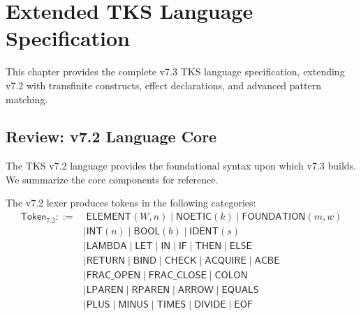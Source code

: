 
\chapter{Extended TKS Language Specification}
\label{ch:extended-language}

\begin{tcolorbox}[colback=blue!5!white,colframe=blue!75!black,title=\vnewthree]
This chapter provides the complete v7.3 TKS language specification, extending v7.2 with transfinite constructs, effect declarations, and advanced pattern matching.
\end{tcolorbox}

\section{Review: v7.2 Language Core}
\label{sec:review-v72-language}

The TKS v7.2 language provides the foundational syntax upon which v7.3 builds. We summarize the core components for reference.

\begin{definition}
\label{def:v72-token-summary}
The v7.2 lexer produces tokens in the following categories:
\begin{align}
\mathsf{Token}_{7.2} ::=&\; \mathsf{ELEMENT}(W, n) \mid \mathsf{NOETIC}(k) \mid \mathsf{FOUNDATION}(m, w) \\
    &\mid \mathsf{INT}(n) \mid \mathsf{BOOL}(b) \mid \mathsf{IDENT}(s) \\
    &\mid \mathsf{LAMBDA} \mid \mathsf{LET} \mid \mathsf{IN} \mid \mathsf{IF} \mid \mathsf{THEN} \mid \mathsf{ELSE} \\
    &\mid \mathsf{RETURN} \mid \mathsf{BIND} \mid \mathsf{CHECK} \mid \mathsf{ACQUIRE} \mid \mathsf{ACBE} \\
    &\mid \mathsf{FRAC\_OPEN} \mid \mathsf{FRAC\_CLOSE} \mid \mathsf{COLON} \\
    &\mid \mathsf{LPAREN} \mid \mathsf{RPAREN} \mid \mathsf{ARROW} \mid \mathsf{EQUALS} \\
    &\mid \mathsf{PLUS} \mid \mathsf{MINUS} \mid \mathsf{TIMES} \mid \mathsf{DIVIDE} \mid \mathsf{EOF}
\end{align}
\end{definition}

